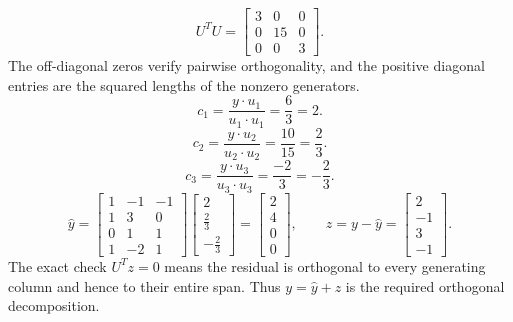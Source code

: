 \[U^TU=\left[\begin{array}{rrr}3&0&0\\0&15&0\\0&0&3\end{array}\right].\]
The off-diagonal zeros verify pairwise orthogonality, and the positive diagonal entries are the squared lengths of the nonzero generators.
\[c_{1}=\frac{y\cdot u_{1}}{u_{1}\cdot u_{1}}=\frac{6}{3}=2.\]
\[c_{2}=\frac{y\cdot u_{2}}{u_{2}\cdot u_{2}}=\frac{10}{15}=\frac{2}{3}.\]
\[c_{3}=\frac{y\cdot u_{3}}{u_{3}\cdot u_{3}}=\frac{-2}{3}=- \frac{2}{3}.\]
\[\widehat y=\left[\begin{array}{rrr}1&-1&-1\\1&3&0\\0&1&1\\1&-2&1\end{array}\right]\left[\begin{array}{r}2\\\frac{2}{3}\\- \frac{2}{3}\end{array}\right]=\left[\begin{array}{r}2\\4\\0\\0\end{array}\right],\qquad z=y-\widehat y=\left[\begin{array}{r}2\\-1\\3\\-1\end{array}\right].\]
The exact check $U^Tz=0$ means the residual is orthogonal to every generating column and hence to their entire span. Thus $y=\widehat y+z$ is the required orthogonal decomposition.


